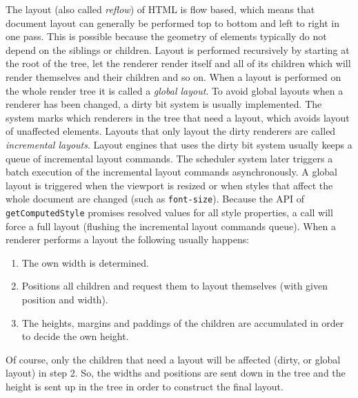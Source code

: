 \documentclass[a4paper,11pt]{kth-mag}
\newcommand{\code}[1]{\texttt{#1}}
\newcommand\abbr[2][]{\uppercase{#2}\ifthenelse{\equal{#1}{}}%
                     {}{#1}}
\begin{document}
        The layout (also called \emph{reflow}) of \abbr{html} is flow based, which means that document layout can generally be performed top to bottom and left to right in one pass.
        This is possible because the geometry of elements typically do not depend on the siblings or children.
        Layout is performed recursively by starting at the root of the tree, let the renderer render itself and all of its children which will render themselves and their children and so on.
        When a layout is performed on the whole render tree it is called a \emph{global layout}.
        To avoid global layouts when a renderer has been changed, a dirty bit system is usually implemented.
        The system marks which renderers in the tree that need a layout, which avoids layout of unaffected elements.
        Layouts that only layout the dirty renderers are called \emph{incremental layouts}.
        Layout engines that uses the dirty bit system usually keeps a queue of incremental layout commands.
        The scheduler system later triggers a batch execution of the incremental layout commands asynchronously.
        A global layout is triggered when the viewport is resized or when styles that affect the whole document are changed (such as \code{font-size}).
        Because the \abbr{api} of \code{getComputedStyle} promises resolved values for all style properties, a call will force a full layout (flushing the incremental layout commands queue).
        When a renderer performs a layout the following usually happens:
        \begin{enumerate}
          \item The own width is determined.
          \item Positions all children and request them to layout themselves (with given position and width).
          \item The heights, margins and paddings of the children are accumulated in order to decide the own height.
        \end{enumerate}
        Of course, only the children that need a layout will be affected (dirty, or global layout) in step 2.
        So, the widths and positions are sent down in the tree and the height is sent up in the tree in order to construct the final layout.
\end{document}

